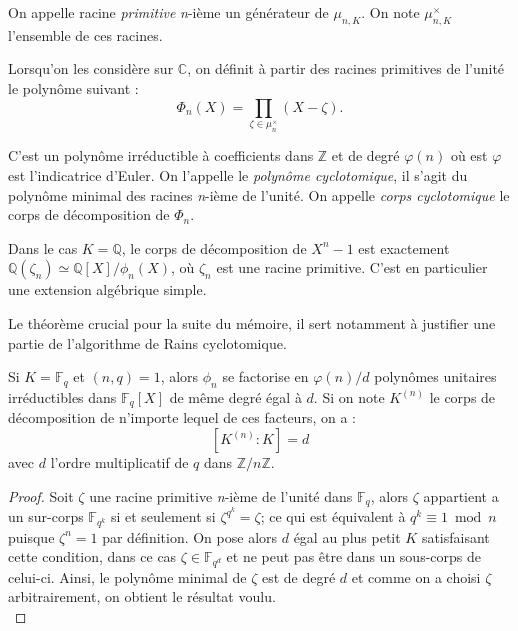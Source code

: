 \documentclass[a4paper]{article} %
\numberwithin{section}{part}
\numberwithin{equation}{section}
\newcommand\nroot[1]{\textit{#1}-ième}
\newcommand\zmodn[1]{\mathbb{Z}/#1\mathbb{Z}}
\newcommand\GF[1]{\mathbb{F}_{#1}}
\newcommand\QQ{\mathbb{Q}}
\newcommand\ZZ{\mathbb{Z}}
\newcommand\CC{\mathbb{C}}
\begin{document}
\begin{defn}
On appelle racine \emph{primitive} \nroot{n} un générateur de $\mu_{n,K}$. On 
note $\mu_{n,K}^{\times}$ l'ensemble de ces racines.
\end{defn}

Lorsqu'on les considère sur $\CC$, on définit à partir des racines primitives de
l'unité le polynôme suivant :
\begin{equation}
\Phi_n(X) = \prod_{\zeta\in \mu_n^{\times}}{(X - \zeta)}.
\end{equation}

C'est un polynôme irréductible à coefficients dans $\ZZ$ et de degré
$\varphi(n)$ où est $\varphi$ est l'indicatrice d'Euler. On l'appelle le
\emph{polynôme cyclotomique}, il s'agit du polynôme minimal des racines
\nroot{n} de l'unité. On appelle \emph{corps cyclotomique} le corps
de décomposition de $\Phi_n$.

\begin{rem}
Dans le cas $K = \QQ$, le corps de décomposition de $X^n - 1$ est exactement 
$\QQ(\zeta_n) \simeq \QQ[X]/\phi_n(X)$, où $\zeta_n$ est une racine primitive. 
C'est en particulier une extension algébrique simple.
\end{rem}

Le théorème crucial pour la suite du mémoire, il sert notamment à justifier une
partie de l'algorithme de Rains cyclotomique.

\begin{thm}
\label{th:polycycldecomp}
Si $K = \GF{q}$ et $(n,q) = 1$, alors $\phi_n$ se factorise en $\varphi(n)/d$ 
polynômes unitaires irréductibles dans $\GF{q}[X]$ de même degré égal à $d$. Si
on note $K^{(n)}$ le corps de décomposition de n'importe lequel de ces facteurs,
on a :
\[[K^{(n)}:K] = d\]
avec $d$ l'ordre multiplicatif de $q$ dans $\zmodn{n}$.
\end{thm}
\begin{proof}
Soit $\zeta$ une racine primitive \nroot{n} de l'unité dans $\GF{q}$, alors 
$\zeta$ appartient a un sur-corps $\GF{q^k}$ si et seulement si $\zeta^{q^k} = 
\zeta$; ce qui est équivalent à $q^k \equiv 1 \bmod n$ puisque $\zeta^n = 1$ par
définition. On pose alors $d$ égal au plus petit $K$ satisfaisant cette 
condition, dans ce cas $\zeta\in\GF{q^d}$ et ne peut pas être dans un sous-corps
de celui-ci. Ainsi, le polynôme minimal de $\zeta$ est de degré $d$ et comme on 
a choisi $\zeta$ arbitrairement, on obtient le résultat voulu.\\
\end{proof}
\end{document}
